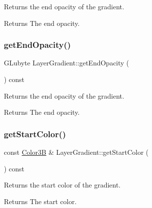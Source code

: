 Returns the end opacity of the gradient.

\begin{DoxyReturn}{Returns}
The end opacity. 
\end{DoxyReturn}
\mbox{\label{classLayerGradient_a2045011cab0c21177dcc93408c1e5c23}} 
\subsubsection{\texorpdfstring{get\+End\+Opacity()}{getEndOpacity()}\hspace{0.1cm}{\footnotesize\ttfamily [2/2]}}
{\footnotesize\ttfamily G\+Lubyte Layer\+Gradient\+::get\+End\+Opacity (\begin{DoxyParamCaption}{ }\end{DoxyParamCaption}) const}

Returns the end opacity of the gradient.

\begin{DoxyReturn}{Returns}
The end opacity. 
\end{DoxyReturn}
\mbox{\label{classLayerGradient_a3c37fc97948a47c5cdae77e8adeb17e3}} 
\subsubsection{\texorpdfstring{get\+Start\+Color()}{getStartColor()}\hspace{0.1cm}{\footnotesize\ttfamily [1/2]}}
{\footnotesize\ttfamily const \hyperlink{structColor3B}{Color3B} \& Layer\+Gradient\+::get\+Start\+Color (\begin{DoxyParamCaption}{ }\end{DoxyParamCaption}) const}

Returns the start color of the gradient.

\begin{DoxyReturn}{Returns}
The start color. 
\end{DoxyReturn}
\mbox{\label{classLayerGradient_a0d35d5f39c25afbccf4282c7519052c5}} 
